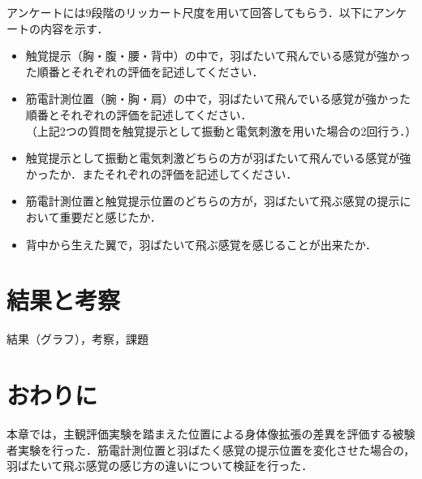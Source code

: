         アンケートには9段階のリッカート尺度\cite{lickert1932method}を用いて回答してもらう．以下にアンケートの内容を示す．
        \begin{itemize}
        \item 触覚提示（胸・腹・腰・背中）の中で，羽ばたいて飛んでいる感覚が強かった順番とそれぞれの評価を記述してください．
        \item 筋電計測位置（腕・胸・肩）の中で，羽ばたいて飛んでいる感覚が強かった順番とそれぞれの評価を記述してください．\\
        （上記2つの質問を触覚提示として振動と電気刺激を用いた場合の2回行う．）
        \item  触覚提示として振動と電気刺激どちらの方が羽ばたいて飛んでいる感覚が強かったか．またそれぞれの評価を記述してください．
        \item 筋電計測位置と触覚提示位置のどちらの方が，羽ばたいて飛ぶ感覚の提示において重要だと感じたか．
        \item 背中から生えた翼で，羽ばたいて飛ぶ感覚を感じることが出来たか．
        \end{itemize}


\section{結果と考察}

        結果（グラフ），考察，課題

\section{おわりに}
        本章では，主観評価実験を踏まえた位置による身体像拡張の差異を評価する被験者実験を行った．筋電計測位置と羽ばたく感覚の提示位置を変化させた場合の，羽ばたいて飛ぶ感覚の感じ方の違いについて検証を行った．

